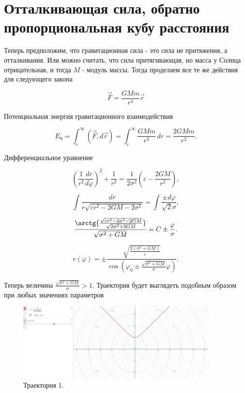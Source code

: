 \documentclass[a4paper]{article}
\begin{document}
\section{Отталкивающая сила, обратно пропорциональная кубу расстояния}
Теперь предположим, что гравитационная сила - это сила не притяжения, а отталкивания. Или можно считать, что сила притягивающая, но масса у Солнца отрицательная, и тогда $M$ - модуль массы. Тогда проделаем все те же действия для следующего закона

\[
\vec{F} = \frac{GMm} {r^4} \vec{r}
\]

Потенциальная энергия гравитационного взаимодействия

\[
E_{\text{п}} = \int_{r}^{\infty}{(\vec{F} , d\vec{r})} = \int_{r}^{\infty}{\frac{GMm}{r^3} \, dr} = \frac{2GMm}{r^2}.
\]

Дифференциальное уравнение

\[
(\frac{1}{r^2}\frac{dr}{d\varphi})^2 + \frac{1}{r^2} = \frac{1}{2\sigma^2}(\varepsilon - \frac{2GM}{r^2}),
\]

\[
\int{\frac{dr}{r\sqrt{\varepsilon r^2 - 2GM - 2\sigma^2}}} = \int{\frac{\pm d\varphi}{\sqrt{2}\sigma}},
\]

\[
\frac{\arctg{\frac{\sqrt{\varepsilon r^2-2\sigma^2-2GM}}{\sqrt{2\sigma^2+2GM}}}}{\sqrt{\sigma^2+GM}} = C \pm \frac{\varphi} {\sigma}.
\]

\begin{equation} \tag{9}
r(\varphi) =\pm \frac{\sqrt{\frac{2(\sigma^2+GM)}{\varepsilon}}}{\cos(\varphi_0 \pm \frac{\sqrt{\sigma^2+GM}}{\sigma}\varphi)}.
\end{equation}

Теперь величина $\frac{\sqrt{\sigma^2+GM}}{\sigma} > 1$. Траектория будет выглядеть подобным образом при любых значениях параметров

\begin{figure}[h]
    \centering
    \includegraphics[width=0.9\textwidth]{Graphic4.jpg}
    \caption{Траектория 1.}
\end{figure}
\end{document}
